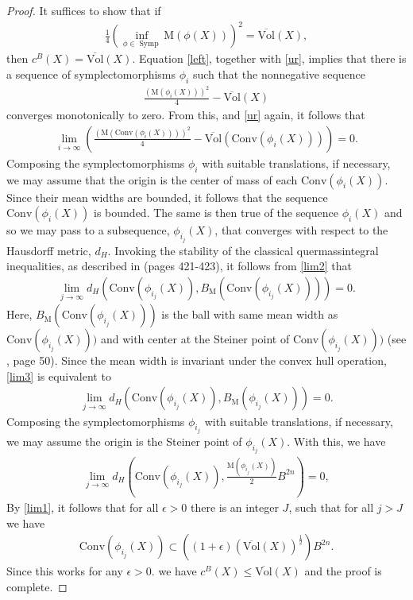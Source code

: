 \documentclass[12pt]{amsart}
\theoremstyle{definition}
\newcommand\Symp{\operatorname{Symp}}
\newcommand{\mw}{{{\mathrm {M}}}}
\newcommand{\C}{{\mathrm{Conv}}}
\newcommand{\sv}{{\overline{{\mathrm{Vol}}}}}
\begin{document}
\begin{proof}
    It suffices to show that  if
    \begin{align}\label{left}
  \frac{1}{4}\left( \inf_{\phi \in \Symp}  \mw(\phi(X))\right)^2=\sv(X), 
  \end{align}
    then $c^B(X) = \sv(X).$ Equation \eqref{left}, together with \eqref{ur}, implies that there is a sequence of symplectomorphisms $\phi_i$ such that the nonnegative sequence \begin{align}\label{lim1}
        \frac{(\mw(\phi_i(X)))^2}{4} - \sv(X)
    \end{align}
converges monotonically to zero. From this, and \eqref{ur} again, it follows that 
    \begin{align}\label{lim2}
        \lim_{i \to \infty}\left(\frac{(\mw(\C(\phi_i(X))))^2}{4} -\sv(\C(\phi_i(X)))\right) = 0.
    \end{align} Composing the symplectomorphisms $\phi_i$ with suitable translations, if necessary, we may assume that the origin is the center of mass of each $\C(\phi_i(X))$. Since their mean widths are bounded, it follows that the sequence  $\C(\phi_i(X))$ is bounded. The same is then true of the sequence $\phi_i(X)$ and so we may pass to a subsequence, $\phi_{i_j}(X)$, that converges with respect to the Hausdorff metric, $d_H$. 
    Invoking the stability of the classical quermassintegral inequalities, as described in \cite{schn} (pages 421-423), it follows from \eqref{lim2} that 
    \begin{align}\label{lim3}
        \lim_{j \to \infty}d_H(\C(\phi_{i_j}(X)), B_{\mw}(\C(\phi_{i_j}(X)))) =0.
    \end{align}
    Here, $B_{\mw}(\C(\phi_{i_j}(X)))$ is the ball with same mean width as $\C(\phi_{i_j}(X)))$ and with center at the Steiner point of $\C(\phi_{i_j}(X)))$ (see \cite{schn}, page 50). Since the mean width is invariant under the convex hull operation, \eqref{lim3} is equivalent to  
\begin{align*}
        \lim_{j \to \infty}d_H(\C(\phi_{i_j}(X)), B_{\mw}(\phi_{i_j}(X))) =0.
    \end{align*}
Composing the symplectomorphisms $\phi_{i_j}$ with suitable translations, if necessary, we may assume the origin is the Steiner point of $\phi_{i_j}(X)$. With this, we have  
    \begin{align*}
        \lim_{j \to \infty}d_H\left(\C(\phi_{i_j}(X)), \frac{\mw(\phi_{i_j}(X))}{2}B^{2n}\right) =0,
    \end{align*}
By \eqref{lim1}, it follows that for all $\epsilon>0$ there is an integer $J$, such that for all $j>J$ we have   
    \begin{align*}
       \C(\phi_{i_j}(X))\subset \left((1+\epsilon)(\sv(X))^{\frac{1}{2}}\right)B^{2n}.
    \end{align*}
Since this works for any $\epsilon>0$. we have $c^B(X) \leq \sv(X)$ and the proof is complete.
\end{proof}
\end{document}
